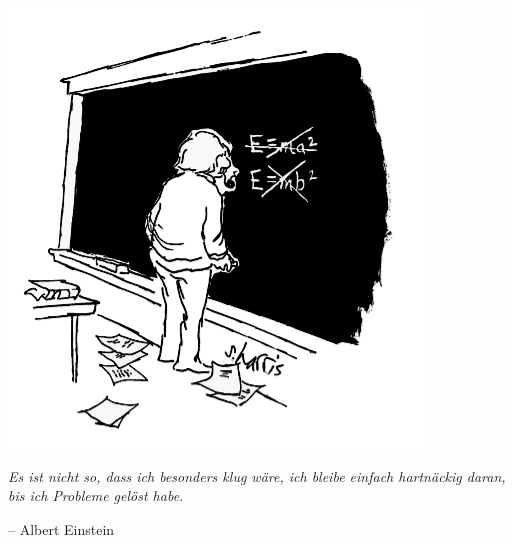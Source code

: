 \documentclass[12pt]{zettel}
\begin{document}
\begin{center}
  \includegraphics[scale=0.4]{einstein}

  \emph{Es ist nicht so, dass ich besonders klug wäre, ich bleibe einfach
  hartnäckig daran, \\ bis ich Probleme gelöst habe.}

  -- Albert Einstein
\end{center}
\end{document}

